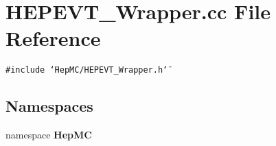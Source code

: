 \section{HEPEVT\_\-Wrapper.cc File Reference}
\label{HEPEVT__Wrapper_8cc}
{\tt \#include \char`\"{}Hep\-MC/HEPEVT\_\-Wrapper.h\char`\"{}}\par
\subsection*{Namespaces}
\begin{CompactItemize}
\item 
namespace {\bf Hep\-MC}
\end{CompactItemize}
